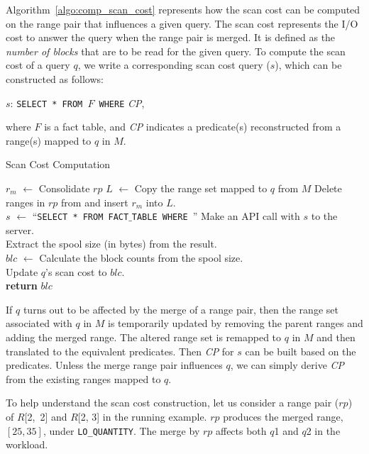 \documentclass[runningheads]{comsis2}
\def\range#1{$[{#1}]$}
\begin{document}
Algorithm~\ref{algo:comp_scan_cost} represents how 
the scan cost can be computed on the range pair that \hbox{influences} a given query. 
The scan cost represents the I/O cost to answer the query when the range pair is merged. 
It is defined as the {\em number of blocks} that are to be read 
for the given query. To compute the scan cost of a query $q$, we write 
a corresponding scan cost query ($s$), which can be constructed as follows: 
\begin{center}
$s$: {\tt SELECT * FROM $F$ WHERE} {\it CP},
\end{center} 
where $F$ is a fact table, and 
{\it CP} indicates a predicate(s) reconstructed from 
a range(s) mapped to $q$ in $M$.

\begin{algorithm}[t]
\caption{Scan Cost Computation}
\label{algo:comp_scan_cost}
{
	$r_{m}$ $\leftarrow$ Consolidate $rp$ \;
	$L$ $\leftarrow$ Copy the range set mapped to $q$ from $M$\; 
	Delete ranges in $rp$ from and insert $r_{m}$ into $L$. \\
	$s$ $\leftarrow$ ``{\tt SELECT * FROM FACT$\_$TABLE WHERE }'' \;
	Make an API call with $s$ to the server. \\
	Extract the spool size (in bytes) from the result. \\
	$blc$ $\leftarrow$ Calculate the block counts from the spool size. \\
	Update $q$'s scan cost to $blc$. \\
	{\bf return} $blc$ \;
}
\end{algorithm}

If $q$ turns out to be affected by the merge of a range pair, 
then the range set associated with $q$ in $M$ is temporarily updated 
by removing the parent ranges and adding the merged range. 
The altered range set is remapped to $q$ in $M$ and then 
translated to the equivalent predicates. Then {\it CP} for $s$ can be built based on the predicates.
Unless the merge range pair influences $q$, 
we can simply derive {\it CP} from the existing ranges mapped to $q$.

To help understand the scan cost construction, let us 
consider a range pair ($rp$) of \hbox{$R$[2, 2]} and $R$[2, 3] in the running example. 
$rp$ produces the merged range, \range{25, 35}, \hbox{under} {\tt LO\_QUANTITY}. 
The merge by $rp$ affects both $q$1 and $q$2 in the workload.  
\end{document}
